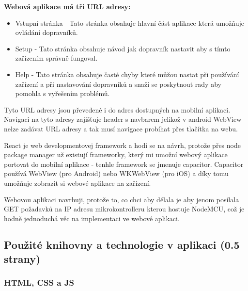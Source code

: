 \textbf{Webová aplikace má tři URL adresy:}
\begin{itemize}
    \item Vstupní stránka - Tato stránka obsahuje hlavní část aplikace která umožňuje ovládání dopravníků.
    \item Setup - Tato stránka obsahuje návod jak dopravník nastavit aby s tímto zařízením správně fungoval.
    \item Help - Tato stránka obsahuje časté chyby které můžou nastat při používání zařízení a při nastavování dopravníků a snaží se poskytnout rady aby pomohla s vyřešením problémů.
\end{itemize}
Tyto URL adresy jsou převedené i do adres dostupných na mobilní aplikaci. Navigaci na tyto adresy zajišťuje header s navbarem jelikož v android WebView nelze zadávat URL adresy a tak musí navigace probíhat přes tlačítka na webu.


React je web developmentovej framework a hodí se na návrh, protože přes node package manager už existují frameworky, který mi umožní webový aplikace portovat do mobilní aplikace - tenhle framework se jmenuje capacitor. Capacitor používá WebView (pro Android) nebo WKWebView (pro iOS) a díky tomu umožňuje zobrazit si webové aplikace na zařízení.\cite{CapacitorDocumentationFAQ}

Webovou aplikaci navrhuji, protože to, co chci aby dělala je aby jenom posílala GET požadavků na IP adresu mikrokontrolleru kterou hostuje NodeMCU, což je hodně jednoduchá věc na implementaci ve webové aplikaci.


\subsection{Použité knihovny a technologie v aplikaci (0.5 strany)}

\subsubsection{HTML, CSS a JS}

